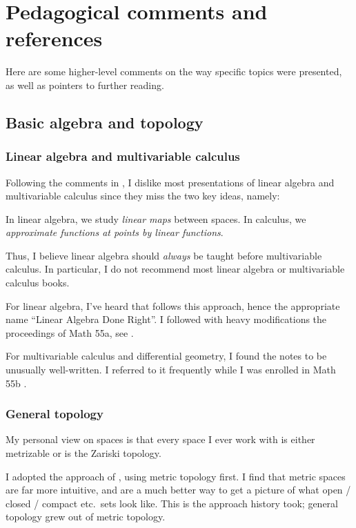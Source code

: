 \chapter{Pedagogical comments and references}
\label{ch:refs}
Here are some higher-level comments on the way specific topics were presented,
as well as pointers to further reading.

\section{Basic algebra and topology}
\subsection{Linear algebra and multivariable calculus}
Following the comments in ,
I dislike most presentations of linear algebra and multivariable calculus
since they miss the two key ideas, namely:
\begin{itemize}
	\ii In linear algebra, we study \emph{linear maps} between spaces.
	\ii In calculus, we \emph{approximate functions at points by linear functions}.
\end{itemize}
Thus, I believe linear algebra should
\emph{always} be taught before multivariable calculus.
In particular, I do not recommend most linear algebra or
multivariable calculus books.

For linear algebra, I've heard that \cite{ref:axler} follows this approach,
hence the appropriate name ``Linear Algebra Done Right''.
I followed with heavy modifications the proceedings of Math 55a,
see \cite{ref:55a}.

For multivariable calculus and differential geometry,
I found the notes \cite{ref:manifolds} to be unusually well-written.
I referred to it frequently while I was enrolled in Math 55b \cite{ref:55b}.

\subsection{General topology}
My personal view on spaces is that every space I ever work with
is either metrizable or is the Zariski topology.

I adopted the approach of \cite{ref:pugh}, using metric topology first.
I find that metric spaces are far more intuitive, and are a much better
way to get a picture of what open / closed / compact etc.\ sets look like.
This is the approach history took;
general topology grew out of metric topology.

